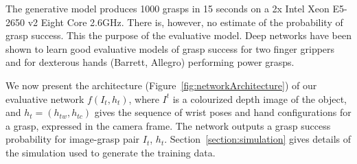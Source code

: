 The generative model produces 1000 grasps in 15 seconds on a 2x Intel Xeon E5-2650 v2 Eight Core 2.6GHz. There is, however, no estimate of the probability of grasp success. This the purpose of the evaluative model. Deep networks have been shown to learn good evaluative models of grasp success for two finger grippers and for dexterous hands (Barrett, Allegro) performing power grasps.  

We now present the architecture (Figure~\ref{fig:networkArchitecture}) of our evaluative network $f(I_t, h_t)$, where $I^t$ is a colourized depth image of the object, and $h_t = (h_{tw}, h_{tc})$ gives the sequence of wrist poses and hand configurations for a grasp, expressed in the camera frame. The network outputs a grasp success probability for image-grasp pair $I_t$, $h_t$. Section~\ref{section:simulation} gives details of the simulation used to generate the training data.

